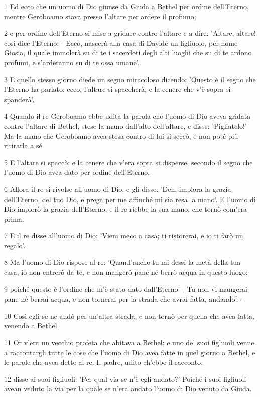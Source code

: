 \par 1 Ed ecco che un uomo di Dio giunse da Giuda a Bethel per ordine dell'Eterno, mentre Geroboamo stava presso l'altare per ardere il profumo;
\par 2 e per ordine dell'Eterno si mise a gridare contro l'altare e a dire: 'Altare, altare! così dice l'Eterno: - Ecco, nascerà alla casa di Davide un figliuolo, per nome Giosia, il quale immolerà su di te i sacerdoti degli alti luoghi che su di te ardono profumi, e s'arderanno su di te ossa umane'.
\par 3 E quello stesso giorno diede un segno miracoloso dicendo: 'Questo è il segno che l'Eterno ha parlato: ecco, l'altare si spaccherà, e la cenere che v'è sopra si spanderà'.
\par 4 Quando il re Geroboamo ebbe udita la parola che l'uomo di Dio aveva gridata contro l'altare di Bethel, stese la mano dall'alto dell'altare, e disse: 'Pigliatelo!' Ma la mano che Geroboamo avea stesa contro di lui si seccò, e non poté più ritirarla a sé.
\par 5 E l'altare si spaccò; e la cenere che v'era sopra si disperse, secondo il segno che l'uomo di Dio avea dato per ordine dell'Eterno.
\par 6 Allora il re si rivolse all'uomo di Dio, e gli disse: 'Deh, implora la grazia dell'Eterno, del tuo Dio, e prega per me affinché mi sia resa la mano'. E l'uomo di Dio implorò la grazia dell'Eterno, e il re riebbe la sua mano, che tornò com'era prima.
\par 7 E il re disse all'uomo di Dio: 'Vieni meco a casa; ti ristorerai, e io ti farò un regalo'.
\par 8 Ma l'uomo di Dio rispose al re: 'Quand'anche tu mi dessi la metà della tua casa, io non entrerò da te, e non mangerò pane né berrò acqua in questo luogo;
\par 9 poiché questo è l'ordine che m'è stato dato dall'Eterno: - Tu non vi mangerai pane né berrai acqua, e non tornerai per la strada che avrai fatta, andando'. -
\par 10 Così egli se ne andò per un'altra strada, e non tornò per quella che avea fatta, venendo a Bethel.
\par 11 Or v'era un vecchio profeta che abitava a Bethel; e uno de' suoi figliuoli venne a raccontargli tutte le cose che l'uomo di Dio avea fatte in quel giorno a Bethel, e le parole che avea dette al re. Il padre, udito ch'ebbe il racconto,
\par 12 disse ai suoi figliuoli: 'Per qual via se n'è egli andato?' Poiché i suoi figliuoli avean veduto la via per la quale se n'era andato l'uomo di Dio venuto da Giuda.
